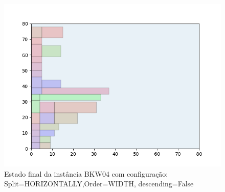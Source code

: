 \begin{figure}[H]
    \centering
    \caption[]{Estado final da instância BKW04 com configuração: Split=HORIZONTALLY,Order=WIDTH, descending=False}
    \label{fig:bkw04-horizontally-width-false}
    \includegraphics[scale=0.5]{output/figures/bkw/bkw04/horizontally/width/false/00}
\end{figure}